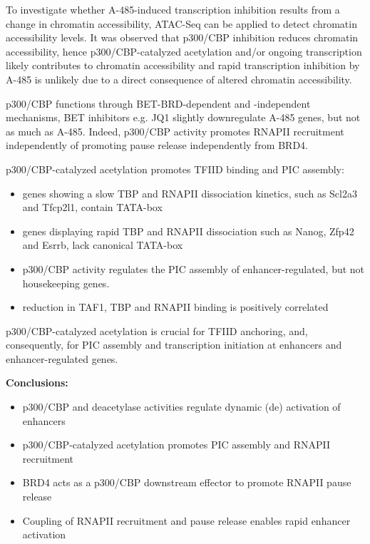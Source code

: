 To investigate whether A-485-induced transcription inhibition results from a change in chromatin accessibility, ATAC-Seq can be applied to detect chromatin accessibility levels. It was observed that p300/CBP inhibition reduces chromatin accessibility, hence p300/CBP-catalyzed acetylation and/or ongoing transcription likely contributes to chromatin accessibility and rapid transcription inhibition by A-485 is unlikely due to a direct consequence of altered chromatin accessibility.

p300/CBP functions through BET-BRD-dependent and -independent mechanisms, BET inhibitors e.g. JQ1 slightly downregulate A-485 genes, but not as much as A-485. Indeed, p300/CBP activity promotes RNAPII recruitment independently of promoting pause release independently from BRD4.

p300/CBP-catalyzed acetylation promotes TFIID binding and PIC assembly:
\begin{itemize}
\tightlist
\item genes showing a slow TBP and RNAPII dissociation kinetics, such as Scl2a3 and Tfcp2l1, contain
TATA-box
\item genes displaying rapid TBP and RNAPII dissociation such as Nanog, Zfp42 and Esrrb, lack
canonical TATA-box
\item p300/CBP activity regulates the PIC assembly of enhancer-regulated, but not housekeeping genes.
\item reduction in TAF1, TBP and RNAPII binding is positively correlated
\end{itemize}

p300/CBP-catalyzed acetylation is crucial for TFIID anchoring, and, consequently, for PIC assembly and transcription initiation at enhancers and enhancer-regulated genes.

\textbf{Conclusions:}
\begin{itemize}
\tightlist
\item p300/CBP and deacetylase activities regulate dynamic (de) activation of enhancers
\item p300/CBP-catalyzed acetylation promotes PIC assembly and RNAPII recruitment
\item BRD4 acts as a p300/CBP downstream effector to promote RNAPII pause release
\item Coupling of RNAPII recruitment and pause release enables rapid enhancer activation
\end{itemize}

